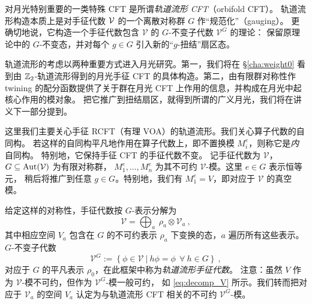 对月光特别重要的一类特殊 CFT 是所谓\emph{轨道流形 CFT}（orbifold CFT）\cite{Dijkgraaf:1989hb}。
轨道流形构造本质上是对手征代数 $\cal{V}$ 的一个离散对称群 $G$ 作“规范化”（gauging）。
更确切地说，它构造一个手征代数包含 $\mathcal{V}$ 的 $G$-不变子代数 $\mathcal{V}^G$ 的理论：
保留原理论中的 $G$-不变态，并对每个 $g\in G$ 引入新的“$g$-扭结”扇区态。

轨道流形的考虑以两种重要方式进入月光研究。第一，我们将在 \S\ref{cha:weight0}
看到由 $\mathbb{Z}_2$-轨道流形得到的月光手征 CFT 的具体构造。第二，由有限群对称性作 twining
的配分函数提供了关于群在月光 CFT 上作用的信息，并构成在月光中起核心作用的模对象。
把它推广到扭结扇区，就得到所谓的广义月光，我们将在讲义下一部分提到。


这里我们主要关心手征 RCFT（有理 VOA）的轨道流形。我们关心算子代数的自同构。
若这样的自同构平凡地作用在算子代数上，即不置换模 $M_i^e$，则称它是\emph{内}自同构。
特别地，它保持手征 CFT 的手征代数不变。
记手征代数为 $\mathcal{V}$，$G\subseteq \operatorname{\text{Aut}}(\mathcal{V})$ 为有限对称群，
$M^e_1,\dots,M^e_n$ 为其不可约 $\mathcal{V}$-模。这里 $e\in G$ 表示恒等元，
稍后将推广到任意 $g\in G$。特别地，我们有 $M_1^e=V$，即对应于 $\mathcal{V}$ 的真空模。

给定这样的对称性，手征代数按 $G$-表示分解为
\begin{equation}
\label{eq:decomp_V}
\mathcal{V}=\bigoplus_a ~\rho_a \otimes \mathcal{V}_a~,
\end{equation}
其中相应空间 $V_a$ 包含在 $G$ 的不可约表示 $\rho_a$ 下变换的态，$a$ 遍历所有这些表示。
$G$-不变子代数
\begin{equation}
\mathcal{V}^G:=\left\lbrace\phi\in\mathcal{V}~|~h\phi=\phi~~\forall~h\in G\right\rbrace~,
\end{equation}
对应于 $G$ 的平凡表示 $\rho_0$，在此框架中称为\emph{轨道流形手征代数}。
注意：虽然 $V$ 作为 $\mathcal{V}$-模不可约，但作为 $\mathcal{V}^G$-模一般可约，
如 \eqref{eq:decomp_V} 所示。我们转而把对应于 $\mathcal{V}_a$ 的空间 $V_a$
认定为与轨道流形 CFT 相关的不可约 $\mathcal{V}^G$-模。


